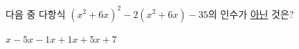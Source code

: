 다음 중 다항식 $(x^2+6x)^2-2(x^2+6x)-35$의 인수가 \underline{아닌} 것은?
\begin{choices32}{$x-5$}{$x-1$}{$x+1$}{$x+5$}{$x+7$}\end{choices32}
